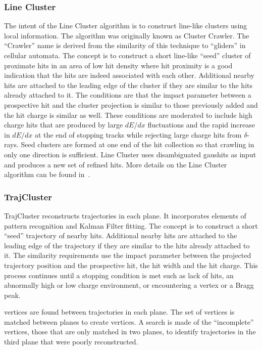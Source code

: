 \subsubsection{Line Cluster}\label{sec:LineCluster}
The intent of the Line Cluster algorithm is to construct \twod line-like clusters using local information. The algorithm was originally known as Cluster Crawler. The ``Crawler'' name is derived from the similarity of this technique to ``gliders'' in \twod cellular automata. The concept is to construct a short line-like ``seed'' cluster of proximate hits in an area of low hit density where hit proximity is a good indication that the hits are indeed associated with each other. Additional nearby hits are attached to the leading edge of the cluster if they are similar to the hits already attached to it. The conditions are that the impact parameter between a prospective hit and the cluster projection is similar to those previously added and the hit charge is similar as well. These conditions are moderated to include high charge hits that are produced by large $dE/dx$ fluctuations and the rapid increase in $dE/dx$ at the end of stopping tracks while rejecting large charge hits from $\delta$-rays.
Seed clusters are formed at one end of the hit collection so that crawling in only one direction is sufficient. Line Cluster uses disambiguated gaushits as input and produces a new set of refined hits. More details on the Line Cluster algorithm can be found in~\cite{ref:linecluster}.

\subsubsection{TrajCluster}\label{sec:TrajCluster}
TrajCluster reconstructs \twod trajectories in each plane. It incorporates elements of pattern recognition and Kalman Filter fitting. The concept is to construct a short ``seed'' trajectory of nearby hits. Additional nearby hits are attached to the leading edge of the trajectory if they are similar to the hits already attached to it. The similarity requirements use the impact parameter between the projected trajectory position and the prospective hit, the hit width and the hit charge. This process continues until a stopping condition is met such as lack of hits, an abnormally high or low charge environment, or encountering a \twod vertex or a Bragg peak.

\twod vertices are found between trajectories in each plane. The set of \twod vertices is matched between planes to create \threed vertices. A search is made of the ``incomplete'' \threed vertices, those that are only matched in two planes, to identify trajectories in the third plane that were poorly reconstructed.

